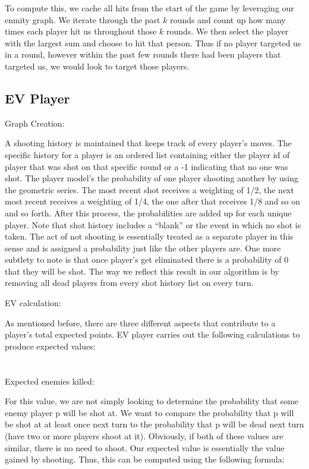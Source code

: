 \documentclass[
10pt, %
letterpaper, %
oneside, %
headinclude,footinclude, %
english
]{article}
\begin{document}
To compute this, we cache all hits from the start of the game by leveraging our enmity graph. We iterate through the past $k$ rounds and count up how many times each player hit us throughout those $k$ rounds. We then select the player with the largest sum and choose to hit that person. Thus if no player targeted us in a round, however within the past few rounds there had been players that targeted us, we would look to target those players.

\subsection{EV Player}
Graph Creation:

A shooting history is maintained that keeps track of every player’s moves. The specific history for a player is an ordered list containing either the player id of player that was shot on that specific round or a -1 indicating that no one was shot. The player model’s the probability of one player shooting another by using the geometric series. The most recent shot receives a weighting of 1/2, the next most recent receives a weighting of 1/4, the one after that receives 1/8 and so on and so forth. After this process, the probabilities are added up for each unique player. Note that shot history includes a “blank” or the event in which no shot is taken. The act of not shooting is essentially treated as a separate player in this sense and is assigned a probability just like the other players are. One more subtlety to note is that once player’s get eliminated there is a probability of 0 that they will be shot. The way we reflect this result in our algorithm is by removing all dead players from every shot history list on every turn.   





EV calculation: 

As mentioned before, there are three different aspects that contribute to a player’s total expected points. EV player carries out the following calculations to produce expected values:
\\
\\
\\
Expected enemies killed: 

For this value, we are not simply looking to determine the probability that some enemy player p will be shot at. We want to compare the probability that p will be shot at at least once next turn to the probability that p will be dead next turn (have two or more players shoot at it). Obviously, if both of these values are similar, there is no need to shoot. Our expected value is essentially the value gained by shooting. Thus, this can be computed using the following formula: 
\end{document}
